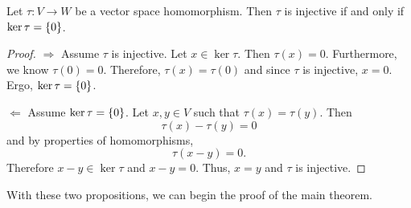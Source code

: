 \documentclass[notitlepage]{simple}
\begin{document}
	\begin{proposition}
		Let $\tau:V\rightarrow W$ be a vector space homomorphism.
		Then $\tau$ is injective if and only if $\ker\tau=\lbrace 0 \rbrace$.
	\end{proposition}
	\begin{proof}
		$\Rightarrow$ Assume $\tau$ is injective.
		Let $x\in\ker\tau$.
		Then $\tau(x)=0$.
		Furthermore, we know $\tau(0)=0$.
		Therefore, $\tau(x)=\tau(0)$ and since $\tau$ is injective, $x=0$.
		Ergo, $\ker\tau=\lbrace 0 \rbrace$.

		\noindent $\Leftarrow$ Assume $\ker\tau=\lbrace 0 \rbrace$.
		Let $x,y\in V$ such that $\tau(x)=\tau(y)$.
		Then
		\[
			\tau(x)-\tau(y)=0
		\]
		and by properties of homomorphisms,
		\[
			\tau(x-y)=0.
		\]
		Therefore $x-y\in\ker\tau$ and $x-y=0$.
		Thus, $x=y$ and $\tau$ is injective.
	\end{proof}

	With these two propositions, we can begin the proof of the main theorem.
\end{document}
